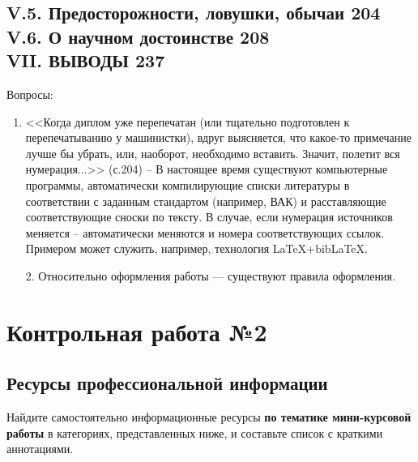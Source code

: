 \documentclass{../../common/thesisbyxetex}
\begin{document}
\section*{V.5. Предосторожности, ловушки, обычаи 204 \\
V.6. О научном достоинстве 208 \\
VII. \uppercase{Выводы} 237}
Вопросы:
\begin{enumerate}
\item <<Когда диплом уже перепечатан (или тщательно подготовлен к перепечатыванию у машинистки), вдруг выясняется, что
какое-то примечание лучше бы убрать, или, наоборот, необходимо вставить. Значит, полетит вся нумерация...>> (с.204) – В
настоящее время существуют компьютерные программы, автоматически компилирующие списки литературы в соответствии с
заданным стандартом (например, ВАК) и расставляющие соответствующие сноски по тексту. В случае, если нумерация
источников меняется – автоматически меняются и номера соответствующих ссылок. Примером может служить, например,
технология \LaTeX+bib\LaTeX.

2. Относительно оформления работы --- существуют правила оформления.
\end{enumerate}



\chapter*{Контрольная работа №2}
\section*{Ресурсы профессиональной информации}

Найдите самостоятельно информационные ресурсы \textbf{по тематике мини-курсовой работы} в категориях, представленных
ниже, и составьте список с краткими аннотациями.
\end{document}
